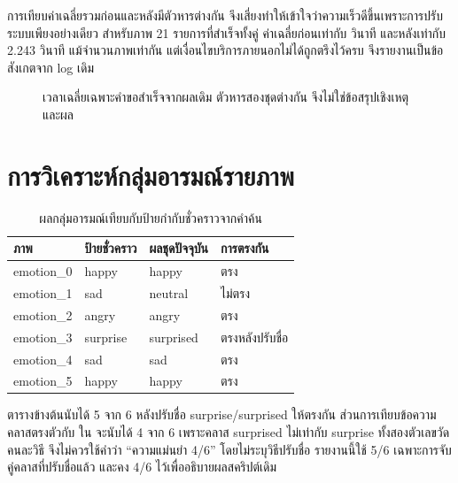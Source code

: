 การเทียบค่าเฉลี่ยรวมก่อนและหลังมีตัวหารต่างกัน จึงเสี่ยงทำให้เข้าใจว่าความเร็วดีขึ้นเพราะการปรับระบบเพียงอย่างเดียว สำหรับภาพ 21 รายการที่สำเร็จทั้งคู่ ค่าเฉลี่ยก่อนเท่ากับ  วินาที และหลังเท่ากับ 2.243 วินาที แม้จำนวนภาพเท่ากัน แต่เงื่อนไขบริการภายนอกไม่ได้ถูกตรึงไว้ครบ จึงรายงานเป็นข้อสังเกตจาก log เดิม

\begin{figure}[H]\centering
{}
\caption{เวลาเฉลี่ยเฉพาะคำขอสำเร็จจากผลเดิม ตัวหารสองชุดต่างกัน จึงไม่ใช่ข้อสรุปเชิงเหตุและผล}
\end{figure}

\section{การวิเคราะห์กลุ่มอารมณ์รายภาพ}
\begin{table}[H]\centering\caption{ผลกลุ่มอารมณ์เทียบกับป้ายกำกับชั่วคราวจากคำค้น}
\begin{tabularx}{\linewidth}{lYYY}\toprule ภาพ & ป้ายชั่วคราว & ผลชุดปัจจุบัน & การตรงกัน\\\midrule
emotion\_0 & happy & happy & ตรง\\
emotion\_1 & sad & neutral & ไม่ตรง\\
emotion\_2 & angry & angry & ตรง\\
emotion\_3 & surprise & surprised & ตรงหลังปรับชื่อ\\
emotion\_4 & sad & sad & ตรง\\
emotion\_5 & happy & happy & ตรง\\\bottomrule
\end{tabularx}\end{table}

ตารางข้างต้นนับได้ 5 จาก 6 หลังปรับชื่อ surprise/surprised ให้ตรงกัน ส่วนการเทียบข้อความคลาสตรงตัวกับ  ใน  จะนับได้ 4 จาก 6 เพราะคลาส surprised ไม่เท่ากับ surprise ทั้งสองตัวเลขวัดคนละวิธี จึงไม่ควรใช้คำว่า ``ความแม่นยำ 4/6'' โดยไม่ระบุวิธีปรับชื่อ รายงานนี้ใช้ 5/6 เฉพาะการจับคู่คลาสที่ปรับชื่อแล้ว และคง 4/6 ไว้เพื่ออธิบายผลสคริปต์เดิม

